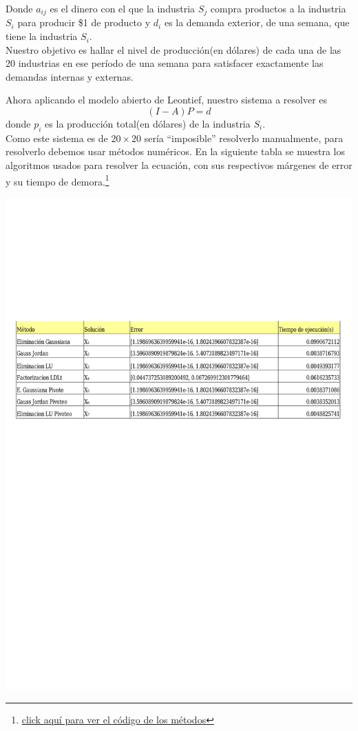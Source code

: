 \documentclass[10pt,a4paper]{article}
\begin{document}
\begin{multicols}{2}
\noindent Donde $a_{ij}$ es el dinero con el que la industria $S_j$ compra productos a la industria $S_i$ para producir \$1 de producto y $d_i$ es la demanda exterior, de una semana, que tiene la industria $S_i$.\\
Nuestro objetivo es hallar el nivel de producción(en dólares) de cada una de las 20 industrias en ese período de una semana para satisfacer exactamente las demandas internas y externas.

\noindent Ahora aplicando el modelo abierto de Leontief, nuestro sistema a resolver es $$(I-A)P=d$$ donde $p_i$ es la producción total(en dólares) de la industria $S_i$.\\
Como este sistema es de $20\times20$ sería ``imposible'' resolverlo manualmente, para resolverlo debemos usar métodos numéricos. En la siguiente tabla se muestra los algoritmos usados para resolver la ecuación, con sus respectivos márgenes de error y su tiempo de demora.\footnote{\href{https://drive.google.com/drive/folders/1F-M1slvs1ibC-nhFcPin_ge0fLCHVb1c?usp=sharing}{\underline{click aquí para ver el código de los métodos}}}
\end{multicols}

\begin{center}
	\includegraphics[page=1, trim= 0cm 16cm 0cm 7cm ,clip,scale=0.8]{tabla}
\end{center}
\end{document}
